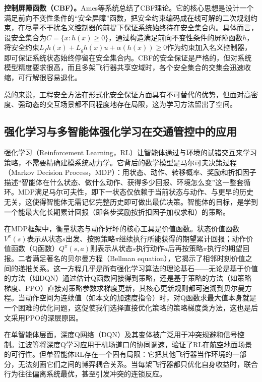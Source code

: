 \documentclass[12pt,a4paper,UTF8]{ctexart}
\begin{document}
\textbf{控制屏障函数（CBF）。}Ames等\cite{ref5}系统总结了CBF理论。它的核心思想是设计一个满足前向不变性条件的“安全屏障”函数，把安全约束编码成在线可解的二次规划约束，在尽量不干扰名义控制器的前提下保证系统始终待在安全集合内。具体而言，设安全集合为$C=\{x:h(x)\geq0\}$，通过构造满足前向不变性条件的屏障函数$h$，将安全约束$L_f h(x)+L_g h(x)u+\alpha(h(x))\geq0$作为约束加入名义控制器，即可保证系统状态始终停留在安全集合内。CBF的安全保证是严格的，但对系统模型精度要求很高，而且多架飞行器共享空域时，各个安全集合的交集会迅速收缩，可行解很容易退化。

总的来说，工程安全方法在形式化安全保证方面具有不可替代的优势，但面对高密度、强动态的交互场景都不同程度地存在局限，这为学习方法留出了空间。

\subsection{强化学习与多智能体强化学习在交通管控中的应用}

强化学习（Reinforcement Learning，RL）让智能体通过与环境的试错交互来学习策略，不需要精确建模系统动力学。它背后的数学模型是马尔可夫决策过程（Markov Decision Process，MDP）：用状态、动作、转移概率、奖励和折扣因子描述“智能体在什么状态、做什么动作、获得多少回报、环境怎么变”这一整套循环。MDP满足马尔可夫性，即下一状态仅依赖于当前状态与动作、与更早的历史无关，这使得智能体无需记忆完整历史即可做出最优决策。智能体的目标，是学到一个能最大化长期累计回报（即各步奖励按折扣因子加权求和）的策略。

在MDP框架中，衡量状态与动作好坏的核心工具是价值函数。状态价值函数$V^\pi(s)$表示从状态$s$出发、按照策略$\pi$继续执行所能获得的期望累计回报；动作价值函数（Q函数）$Q^\pi(s,a)$则表示从状态$s$执行动作$a$后再按策略$\pi$执行的期望回报。二者满足著名的贝尔曼方程（Bellman equation），它揭示了相邻时刻价值之间的递推关系。这一方程几乎是所有强化学习算法的理论基石——无论是基于价值的方法（如DQN）通过估计Q函数间接得到策略，还是基于策略的方法（如策略梯度、PPO）直接对策略参数求梯度更新，其核心更新规则都可追溯到贝尔曼方程。当动作空间为连续值（如本文的加速度指令）时，对Q函数求最大值本身就是一个困难的优化问题，这促使我们选择直接优化策略的策略梯度类方法，这也是后文采用PPO的深层原因。

在单智能体层面，深度Q网络（DQN）\cite{ref40}及其变体被广泛用于冲突规避和信号控制\cite{ref12,ref15,ref16,ref17,ref18,ref19,ref20,ref21,ref22}。江波等\cite{ref21}将深度Q学习应用于机场道口的协同调速，验证了RL在航空地面场景的可行性。但单智能体RL存在一个固有局限：它把其他飞行器当作环境的一部分，无法刻画它们之间的博弈耦合关系。当每架飞行器都只优化自身收益时，联合行为往往偏离系统最优，甚至引发冲突的连锁反应。
\end{document}
